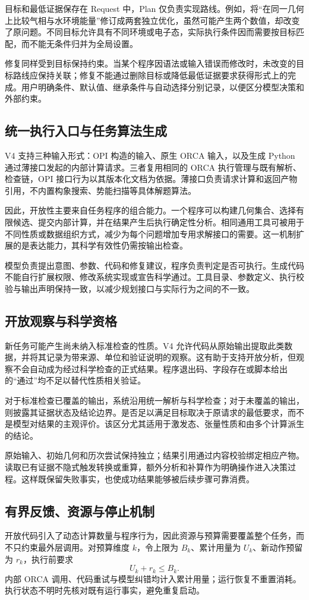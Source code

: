 目标和最低证据保存在 Request 中，Plan 仅负责实现路线。例如，将“在同一几何上比较气相与水环境能量”修订成两套独立优化，虽然可能产生两个数值，却改变了原问题。不同目标允许具有不同环境或电子态，实际执行条件因而需要按目标匹配，而不能无条件归并为全局设置。

修复同样受到目标保持约束。当某个程序因语法或输入错误而修改时，未改变的目标路线应保持关联；修复不能通过删除目标或降低最低证据要求获得形式上的完成。用户明确条件、默认值、继承条件与自动选择分别记录，以便区分模型决策和外部约束。

\subsection{统一执行入口与任务算法生成}
V4 支持三种输入形式：OPI 构造的输入、原生 ORCA 输入，以及生成 Python 通过薄接口发起的内部计算请求。三者复用相同的 ORCA 执行管理与既有解析、检查链，OPI 接口行为以其版本化文档为依据\cite{opi}。薄接口负责请求计算和返回产物引用，不内置构象搜索、势能扫描等具体解题算法。

因此，开放性主要来自任务程序的组合能力。一个程序可以构建几何集合、选择有限候选、提交内部计算，并在结果产生后执行确定性分析。相同通用工具可被用于不同性质或数据组织方式，减少为每个问题增加专用求解接口的需要。这一机制扩展的是表达能力，其科学有效性仍需按输出检查。

模型负责提出意图、参数、代码和修复建议，程序负责判定是否可执行。生成代码不能自行扩展权限、修改系统实现或宣告科学通过。工具目录、参数定义、执行校验与输出声明保持一致，以减少规划接口与实际行为之间的不一致。

\subsection{开放观察与科学资格}
新任务可能产生尚未纳入标准检查的性质。V4 允许代码从原始输出提取此类数据，并将其记录为带来源、单位和验证说明的观察。这有助于支持开放分析，但观察不会自动成为经过科学检查的正式结果。程序退出码、字段存在或脚本给出的“通过”均不足以替代性质相关验证。

对于标准检查已覆盖的输出，系统沿用统一解析与科学检查；对于未覆盖的输出，则披露其证据状态及结论边界。是否足以满足目标取决于原请求的最低要求，而不是模型对结果的主观评价。该区分尤其适用于激发态、张量性质和由多个计算派生的结论。

原始输入、初始几何和历次尝试保持独立；结果引用通过内容校验绑定相应产物。读取已有证据不隐式触发转换或重算，额外分析和补算作为明确操作进入决策过程。这样既保留失败事实，也使成功结果能够被后续步骤可靠消费。

\subsection{有界反馈、资源与停止机制}
开放代码引入了动态计算数量与程序行为，因此资源与预算需要覆盖整个任务，而不只约束最外层调用。对预算维度 $k$，令上限为 $B_k$、累计用量为 $U_k$、新动作预留为 $r_k$，执行前要求
\begin{equation}
U_k+r_k\leq B_k.
\end{equation}
内部 ORCA 调用、代码重试与模型纠错均计入累计用量；运行恢复不重置消耗。执行状态不明时先核对既有运行事实，避免重复启动。

